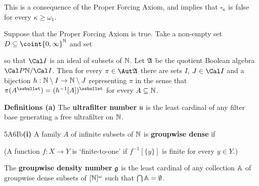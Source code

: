 \noindent This is a consequence of the Proper Forcing Axiom, and
implies that $\square_{\kappa}$ is false for every
$\kappa\ge\omega_1$.

Suppose that the Proper Forcing Axiom is true.
Take a non-empty set $D\subseteq\coint{0,\infty}^{\Bbb N}$ and set


\noindent so that $\Cal I$ is an ideal of subsets of $\Bbb N$.
Let $\frak A$ be the quotient Boolean algebra $\Cal P\Bbb N/\Cal I$.
Then for every $\pi\in\Aut\frak A$ there are sets $I$, $J\in\Cal I$ and a
bijection
$h:\Bbb N\setminus I\to\Bbb N\setminus J$ representing $\pi$ in the sense
that $\pi(A^{\ssbullet})=(h^{-1}[A])^{\ssbullet}$ for every
$A\subseteq\Bbb N$.

 {\bf Definitions
(a)} The {\bf ultrafilter number} $\frak u$ is 
the least cardinal of any filter base
generating a free ultrafilter on $\Bbb N$.

\spheader 5A6Ib{\bf (i)} A family $A$ of infinite subsets of $\Bbb N$
is {\bf groupwise dense} if


\noindent (A function $f:X\to Y$ is `finite-to-one' if $f^{-1}[\{y\}]$ is
finite for every $y\in Y$.)

\medskip

 The {\bf groupwise density number} $\frak g$ is
the least cardinal of any collection $\Bbb A$
of groupwise dense subsets of $[\Bbb N]^{\omega}$ such that
$\bigcap\Bbb A=\emptyset$.



